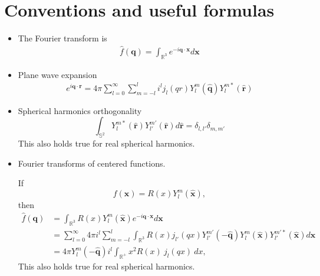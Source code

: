 \documentclass[a4paper]{amsart}
\def\R{{\mathbb R}}
\newcommand{\I}{i}
\renewcommand{\vec}[1]{{\mathbf{#1}}}
\newcommand*{\uvec}[1]{\ensuremath{\hat{{\boldsymbol{#1}}}}}	%
\newcommand{\D}{d}
\begin{document}
\section{Conventions and useful formulas}
\begin{itemize}
\item The Fourier transform is
  \begin{align*}
    \widehat{f}(\vec q) = \int_{\R^{3}} e^{-i\vec q \cdot \vec x} d\vec x
  \end{align*}
\item Plane wave expansion
  \begin{align*}
    e^{\I \vec{q} \cdot \vec{r}} =
  4 \pi \sum_{l = 0}^\infty \sum_{m = -l}^l
  \I^l j_l(q r) Y_l^m(\uvec{q}) Y_l^{m\ast}(\uvec{r})
\end{align*}
\item Spherical harmonics orthogonality
  \[
    \int_{\mathbb{S}^2} Y_l^{m*}(\uvec{r})Y_{l'}^{m'}(\uvec{r}) \D \uvec{r}
  = \delta_{l,l'} \delta_{m,m'}
\]
This also holds true for real spherical harmonics.
\item Fourier transforms of centered functions.

  If 
\[ f(\vec{x}) = R(x) Y_l^m(\uvec{x}),\]
then
\begin{align*}
  \hat f(\vec q)
  &= \int_{\R^3} R(x) Y_{l}^{m}(\uvec x) e^{-\I \vec{q} \cdot \vec{x}} \D\vec{x} \\
  &= \sum_{l = 0}^\infty 4 \pi \I^l 
  \sum_{m = -l}^l \int_{\R^3}
  R(x) j_{l'}(q x)Y_{l'}^{m'}(-\uvec{q}) Y_{l}^{m}(\uvec{x})
   Y_{l'}^{m'\ast}(\uvec{x})
  \D\vec{x} \\
  &= 4 \pi Y_{l}^{m}(-\uvec{q}) \I^{l}
  \int_{\R^+} x^2 R(x) \ j_{l}(q x)
  \
   \D x,
 \end{align*}
This also holds true for real spherical harmonics.
\end{itemize}
\end{document}
